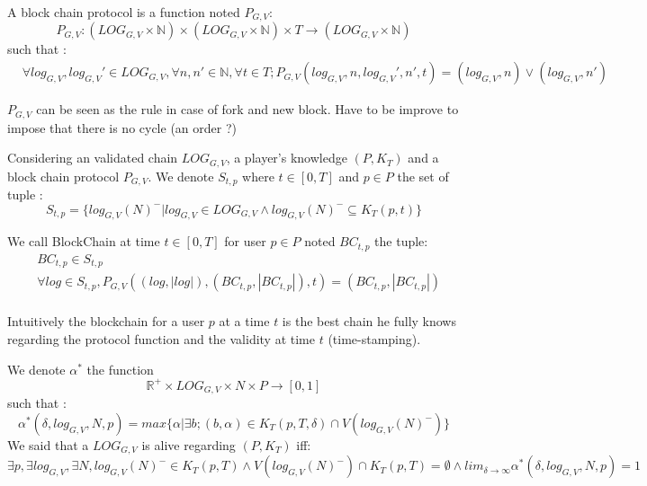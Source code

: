 \begin{mydef}
	A block chain protocol is a function noted $P_{G,V}$:
	$$P_{G,V} : (LOG_{G,V}\times \mathbb{N})  \times (LOG_{G,V}\times \mathbb{N}) \times T \rightarrow (LOG_{G,V}\times \mathbb{N}) $$
	such that :
		\begin{align*}
		&\forall log_{G,V},log_{G,V}' \in LOG_{G,V}, \forall n,n' \in \mathbb{N} , \forall t \in T; P_{G,V}(log_{G,V},n,log_{G,V}',n',t) = (log_{G,V},n) \lor (log_{G,V},n')		\end{align*}
\end{mydef}
\begin{myrem}
	$P_{G,V}$ can be seen as the rule in case of fork and new block. 
	Have to be improve to impose that there is no cycle (an order ?)
\end{myrem}

\begin{mydef}
	Considering an validated chain $LOG_{G,V}$, a player's knowledge $(P,K_T)$ and a block chain protocol $P_{G,V}$. We denote $S_{t,p}$ where $t\in [0,T]$ and $p\in P$ the set of tuple :
	$$ S_{t,p} = \{log_{G,V}(N)^- | log_{G,V} \in LOG_{G,V} \land log_{G,V}(N)^- \subseteq K_T(p,t)\} $$
	
	We call BlockChain at time $t\in [0,T]$ for user $p \in P$ noted $BC_{t,p}$ the tuple:
	\begin{align*}
	&BC_{t,p} \in S_{t,p} \\
	& \forall log \in S_{t,p}, P_{G,V}((log,|log|),(BC_{t,p},|BC_{t,p}|),t) = (BC_{t,p},|BC_{t,p}|) \\
	\end{align*}
	
\end{mydef}
\begin{myrem}
	Intuitively the blockchain for a user $p$ at a time $t$ is the best chain he fully knows regarding the protocol function and the validity at time $t$ (time-stamping).
\end{myrem}

\begin{mydef}
	We denote $\alpha^*$ the function $$ \mathbb{R}^+ \times LOG_{G,V} \times N \times P \rightarrow [0,1]$$ such that : 
	$$\alpha^*(\delta,log_{G,V},N,p) = max\{\alpha | \exists b; (b,\alpha) \in K_T(p,T,\delta)\cap V(log_{G,V}(N)^-)\} $$
	We said that a $LOG_{G,V}$ is alive regarding $(P,K_T)$ iff:
	$$\exists p, \exists log_{G,V}, \exists N, log_{G,V}(N)^- \in K_T(p,T) \land V(log_{G,V}(N)^-) \cap K_T(p,T) = \emptyset \land lim_{\delta\rightarrow \infty} \alpha^*(\delta,log_{G,V},N,p) = 1$$
\end{mydef}


